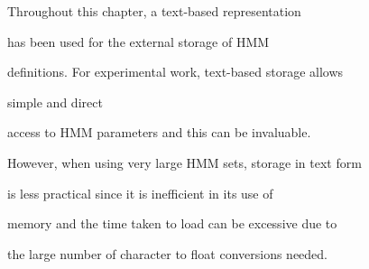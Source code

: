 









Throughout this chapter, a text-based representation


has been used for the external storage of HMM


definitions.  For experimental work, text-based storage allows


simple and direct 


access to HMM parameters and this can be invaluable.


However, when using very large HMM sets, storage in text form


is less practical since it is inefficient in its use of


memory and the time taken to load can be excessive due to


the large number of character to float conversions needed.





